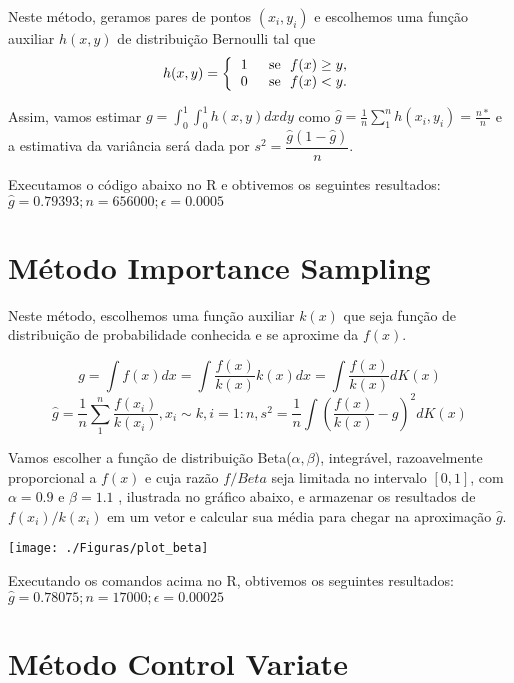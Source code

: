 \documentclass{article}
\begin{document}
Neste método, geramos pares de pontos $(x_i,y_i)$ e escolhemos uma função auxiliar $h(x,y)$ de distribuição Bernoulli tal que 
\[
  h(x,y)= \left\{
    \begin{tabular}[]{cc}
     1 & \text{ se } $f(x) \geq y$,\\
     0 & \text{ se } $f(x) < y$.
    \end{tabular}
    \right.
  \]
  
  
  Assim, vamos estimar $g=\int_{0}^{1}\int_{0}^{1}h(x,y)dxdy$ como $\hat{g}=\frac{1}{n}\sum_{1}^{n}h(x_i,y_i)=\frac{n*}{n}$ e a estimativa da variância será dada por $s^2 = \dfrac{\hat{g}(1-\hat{g})}{n}$.
  
  
  Executamos o código abaixo no R e obtivemos os seguintes resultados:\\
 
  $\hat{g}=0.79393; n = 656000;    \epsilon = 0.0005$

\section{Método Importance Sampling}


Neste método, escolhemos uma função auxiliar $k(x)$ que seja função de distribuição de probabilidade conhecida e se aproxime da $f(x)$.

$$
g = \int f(x)dx = \int\frac{f(x)}{k(x)} k(x)dx = \int \frac{f(x)}{k(x)}dK(x)
$$
$$
\hat{g} = \frac{1}{n}\sum_{1}^{n}\frac{f(x_i)}{k(x_i)}, x_i \sim k, i =1:n,s^2 = \frac{1}{n}\int\left(\frac{f(x)}{k(x)} - \hat{g}\right)^2dK(x)
$$


Vamos escolher a função de distribuição Beta($\alpha,\beta$), integrável, razoavelmente proporcional a $f(x)$ e cuja razão $f/Beta$ seja limitada no intervalo $[0,1]$, com $\alpha = 0.9$ e $\beta=1.1$ , ilustrada no gráfico abaixo, e armazenar os resultados de $f(x_i)/k(x_i)$ em um vetor e calcular sua média para chegar na aproximação $\hat{g}$.
\begin{center}
  \texttt{[image: ./Figuras/plot\_beta]}\\
\end{center}  



Executando os comandos acima no R, obtivemos os seguintes resultados:\\
 $\hat{g}=0.78075; n = 17000;    \epsilon = 0.00025$

\section{Método Control Variate}
\end{document}
